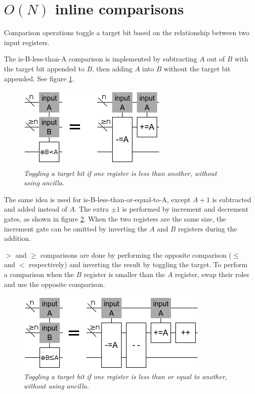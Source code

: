\documentclass[twocolumn]{article}
\begin{document}
\section{$O(N)$ inline comparisons}

Comparison operations toggle a target bit based on the relationship between two input registers.

The is-B-less-than-A comparison is implemented by subtracting $A$ out of $B$ with the target bit appended to $B$, then adding $A$ into $B$ without the target bit appended.
See figure \ref{fig:comparison-less}.

\begin{figure}
  \centering
  \includegraphics[totalheight=3cm]{comparison-less.png}
  \caption{\em Toggling a target bit if one register is less than another, without using ancilla.}
  \label{fig:comparison-less}
\end{figure}

The same idea is used for is-B-less-than-or-equal-to-A, except $A+1$ is subtracted and added instead of $A$.
The extra $\pm 1$ is performed by increment and decrement gates, as shown in figure \ref{fig:comparison-leq}.
When the two registers are the same size, the increment gate can be omitted by inverting the $A$ and $B$ registers during the addition.

$>$ and $\geq$ comparisons are done by performing the opposite comparison ($\leq$ and $<$ respectively) and inverting the result by toggling the target.
To perform a comparison when the $B$ register is smaller than the $A$ register, swap their roles and use the opposite comparison.

\begin{figure}
  \centering
  \includegraphics[totalheight=3cm]{comparison-leq.png}
  \caption{\em Toggling a target bit if one register is less than or equal to another, without using ancilla.}
  \label{fig:comparison-leq}
\end{figure}
\end{document}
